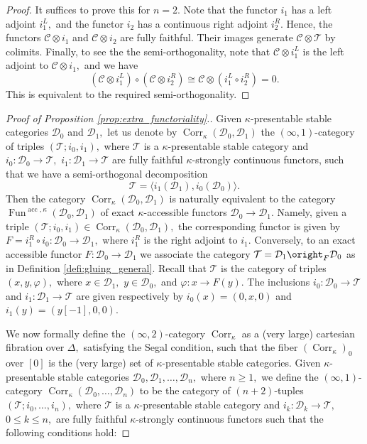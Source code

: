 \documentclass[11pt,leqno]{amsart}
\numberwithin{equation}{section}
\newcommand{\Corr}{\operatorname{Corr}}
\newcommand{\acc}{\operatorname{acc}}
\newcommand{\cD}{{\mathcal D}}
\newcommand{\cC}{{\mathcal C}}
\newcommand{\cT}{{\mathcal T}}
\newcommand{\Fun}{\operatorname{Fun}}
\begin{document}
\begin{proof} It suffices to prove this for $n=2.$ Note that the functor $i_1$ has a left adjoint $i_1^L,$ and the functor $i_2$ has a continuous right adjoint $i_2^R.$ Hence, the functors $\cC\otimes i_1$ and $\cC\otimes i_2$ are fully faithful. Their images generate $\cC\otimes\cT$ by colimits. Finally, to see the the semi-orthogonality, note that $\cC\otimes i_1^L$ is the left adjoint to $\cC\otimes i_1,$ and we have
$$(\cC\otimes i_1^L)\circ (\cC\otimes i_2^R)\cong \cC\otimes (i_1^L\circ i_2^R)=0.$$
This is equivalent to the required semi-orthogonality.
\end{proof}

\begin{proof}[Proof of Proposition \ref{prop:extra_functoriality}.] Given $\kappa$-presentable stable categories $\cD_0$ and $\cD_1,$ let us denote by $\Corr_{\kappa}(\cD_0,\cD_1)$ the $(\infty,1)$-category of triples $(\cT;i_0,i_1),$ where $\cT$ is a $\kappa$-presentable stable category and $i_0:\cD_0\to\cT,$ $i_1:\cD_1\to\cT$ are fully faithful $\kappa$-strongly continuous functors, such that we have a semi-orthogonal decomposition $$\cT=\langle i_1(\cD_1),i_0(\cD_0)\rangle.$$
Then the category $\Corr_{\kappa}(\cD_0,\cD_1)$ is naturally equivalent to the category $\Fun^{\acc,\kappa}(\cD_0,\cD_1)$ of exact $\kappa$-accessible functors $\cD_0\to\cD_1.$ Namely, given a triple $(\cT;i_0,i_1)\in\Corr_{\kappa}(\cD_0,\cD_1),$ the corresponding functor is given by $F=i_1^R\circ i_0:\cD_0\to \cD_1,$ where $i_1^R$ is the right adjoint to $i_1.$ Conversely, to an exact accessible functor $F:\cD_0\to \cD_1$ we associate the category $\cT=\cD_1\oright_F\cD_0$ as in Definition \ref{defi:gluing_general}. Recall that $\cT$ is the category of triples $(x,y,\varphi),$ where $x\in \cD_1,$ $y\in \cD_0,$ and $\varphi:x\to F(y).$ The inclusions $i_0:\cD_0\to\cT$ and $i_1:\cD_1\to\cT$ are given respectively by $i_0(x)=(0,x,0)$ and $i_1(y)=(y[-1],0,0).$

We now formally define the $(\infty,2)$-category $\Corr_{\kappa}$ as a (very large) cartesian fibration over $\Delta,$ satisfying the Segal condition, such that the fiber $(\Corr_{\kappa})_0$ over $[0]$ is the (very large) set of $\kappa$-presentable stable categories. Given $\kappa$-presentable stable categories $\cD_0,\cD_1,\dots,\cD_n,$ where $n\geq 1,$ we define the $(\infty,1)$-category $\Corr_{\kappa}(\cD_0,\dots,\cD_n)$ to be the category of $(n+2)$-tuples $(\cT;i_0,\dots,i_n),$ where $\cT$ is a $\kappa$-presentable stable category and $i_k:\cD_k\to\cT,$ $0\leq k\leq n,$ are fully faithful $\kappa$-strongly continuous functors such that the following conditions hold: 


\end{proof}
\end{document}
